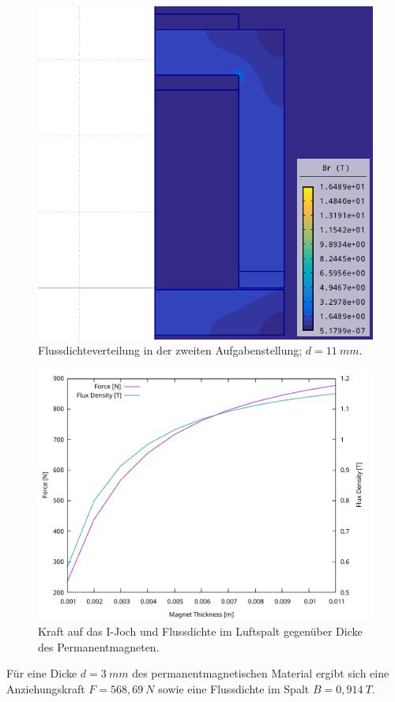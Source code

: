 \documentclass[conference,a4paper,twoside]{IEEEtran}
\begin{document}
\begin{figure}[H]
\centerline{\includegraphics[width=0.7\columnwidth]{../assets/assignment_2_simulation.png}}
\caption{Flussdichteverteilung in der zweiten Aufgabenstellung; $d = 11\ mm$.}
\label{assignment_2_simulation}
\end{figure}

\begin{figure}[H]
\centerline{\includegraphics[width=\columnwidth]{../assets/assignment_2_plot.pdf}}
\caption{Kraft auf das I-Joch und Flussdichte im Luftspalt gegenüber Dicke des Permanentmagneten.}
\label{assignment_2_plot}
\end{figure}

Für eine Dicke $d = 3\ mm$ des permanentmagnetischen Material ergibt sich eine Anziehungskraft $F = 568,69\ N$ sowie eine Flussdichte im Spalt $B = 0,914\ T$.
\end{document}
